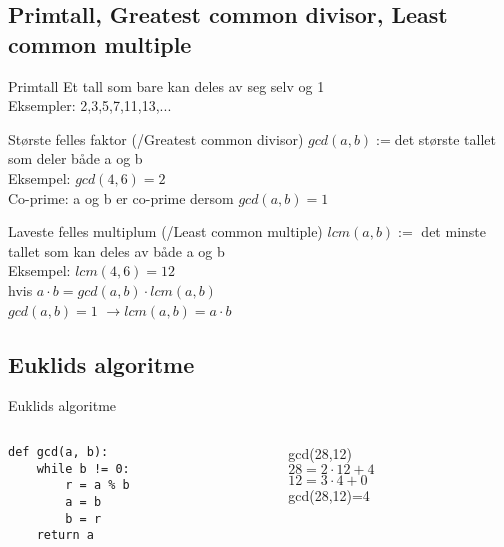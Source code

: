 \subsection*{Primtall, Greatest common divisor, Least common multiple}
\begin{frame}
\begin{block}{Primtall}
Et tall som bare kan deles av seg selv og 1\\
Eksempler: 2,3,5,7,11,13,...
\end{block}
\pause
\begin{block}{Største felles faktor (/Greatest common divisor)}
$gcd(a,b) := $det største tallet som deler både a og b\\
Eksempel: $gcd(4,6)=2$\\
Co-prime: a og b er co-prime dersom $gcd(a,b)=1$
\end{block}
\pause
\begin{block}{Laveste felles multiplum (/Least common multiple)}
$lcm(a,b) := $ det minste tallet som kan deles av både a og b\\
Eksempel: $lcm(4,6)=12$\\
hvis $a\cdot b=gcd(a,b)\cdot lcm(a,b)$\\
$gcd(a,b) = 1$ $\rightarrow lcm(a,b) = a\cdot b$
\end{block}
\end{frame}

\subsection*{Euklids algoritme}
\begin{frame}[fragile]{Euklids algoritme}
\begin{columns}
    \begin{column}{0.45\textwidth}
\begin{verbatim}
def gcd(a, b):
    while b != 0:
        r = a % b
        a = b
        b = r
    return a
\end{verbatim}
 	\end{column}
 	\pause
    \begin{column}{0.45\textwidth}
    \begin{center}
       gcd(28,12)\\
       
    $28=2\cdot 12+4$\\
    $12=3\cdot 4+0$\\
    
    gcd(28,12)=4 
    \end{center}
 	\end{column}
\end{columns}


\end{frame}

